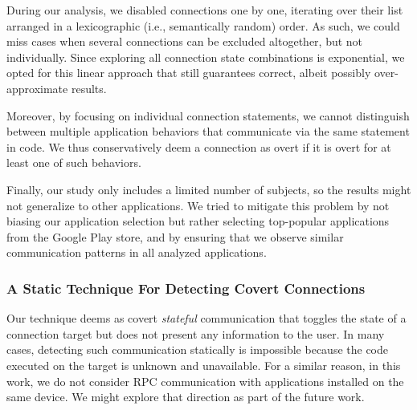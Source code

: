 During our analysis, we disabled connections one by one, iterating over their list arranged in a lexicographic (i.e., semantically random) order. As such, we could miss cases when 
several connections can be excluded altogether, but not individually. 
Since exploring all connection state combinations is exponential, we opted for this linear approach that still guarantees correct, 
albeit possibly over-approximate results. 

Moreover, by focusing on individual connection statements, we cannot distinguish between multiple application behaviors
that communicate via the same statement in code. We thus conservatively deem a connection as overt if it is overt for at least one of such behaviors. 
 
Finally, our study only includes a limited number of subjects, so the results might not generalize to other applications.
We tried to mitigate this problem by not biasing our application selection but rather selecting top-popular applications from the Google Play store, and by ensuring that we observe similar communication patterns in all analyzed applications.

\subsubsection{A Static Technique For Detecting Covert Connections}
Our technique deems 
%
as covert \emph{stateful} communication that toggles
the state of a connection target but does not present any information to the user. 
In many cases, detecting such
communication statically is impossible because the code executed on
the target is unknown and unavailable. 
For a similar reason, in this work, we do not consider RPC communication with applications
installed on the same device. We might explore that direction as part of the future work. 
 
